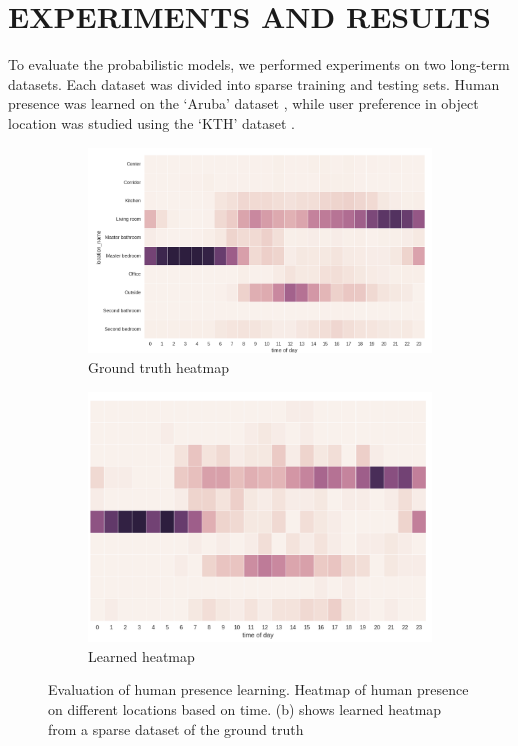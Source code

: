 \documentclass[a4paper, 10pt, conference]{ieeeconf}      %
\begin{document}
\section{EXPERIMENTS AND RESULTS}
To  evaluate  the  probabilistic  models,  we  performed  experiments on two  long-term  datasets.  Each  dataset  was  divided  into sparse training and testing sets. Human presence was learned on the  ‘Aruba’ dataset \cite{c6},  while user preference in object location was studied using the ‘KTH’ dataset \cite{c5}. 
\begin{figure}[!tbp]
  \begin{subfigure}[b]{0.243\textwidth}
    \includegraphics[width=\textwidth]{aruba.png}
    \caption{Ground truth heatmap}
    \label{fig:f1}
  \end{subfigure}
  \hspace{0.01em}
  \begin{subfigure}[b]{0.2\textwidth}
    \includegraphics[width=\textwidth]{learned-aruba.png}
    \caption{Learned heatmap}
    \label{fig:f2}
  \end{subfigure}
  \caption{Evaluation of human presence learning. Heatmap of human presence on different locations based on time. (b) shows learned heatmap from a sparse dataset of the ground truth}
  \label{fig:f1_2}
\end{figure}
\end{document}
